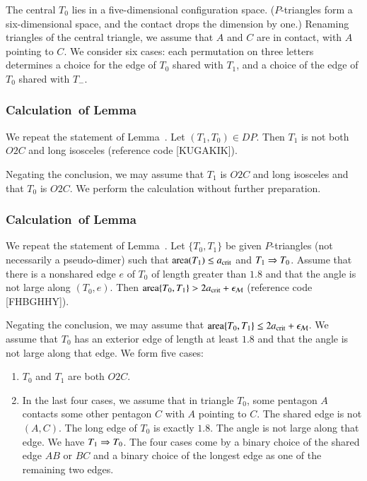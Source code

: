 The central $T_0$ lies in a five-dimensional configuration
space. ($P$-triangles form a six-dimensional space, and the contact
drops the dimension by one.)  Renaming triangles of the central
triangle, we assume that $A$ and $C$ are in contact, with $A$ pointing
to $C$.  We consider six cases: each permutation on three letters
determines a choice for the edge of $T_0$ shared with $T_1$, and a
choice of the edge of $T_0$ shared with $T_-$.

\subsubsection{Calculation~of Lemma~}

We repeat the statement of Lemma~.  Let
$(T_1,T_0)\in DP$.  Then $T_1$ is not both $O2C$ and long isosceles
(reference code [KUGAKIK]).

Negating the conclusion, we may assume that $T_1$ is $O2C$ and long
isosceles and that $T_0$ is $O2C$.  We perform the calculation without
further preparation.

\subsubsection{Calculation~of Lemma~} %

We repeat the statement of Lemma~.  Let $\{T_0,T_1\}$
be given $P$-triangles (not necessarily a pseudo-dimer) such that
${\operatorname{area}}(T_1)\le a_\text{crit}$ and $T_1\Rightarrow T_0$.  Assume that there is a
nonshared edge $e$ of $T_0$ of length greater than $1.8$ and that the
angle is not large along $(T_0,e)$.  Then ${\operatorname{area}}\{T_0,T_1\} > 2a_\text{crit}
+ \epsilon_{\mathcal M}$ (reference code [FHBGHHY]).

Negating the conclusion, we may assume that ${\operatorname{area}}\{T_0,T_1\}\le
2a_\text{crit} + \epsilon_{\mathcal M}$.  We assume that $T_0$ has an exterior edge of length
at least $1.8$ and that the angle is not large along that edge.  We
form five cases:
\begin{enumerate}  
\item $T_0$ and $T_1$ are both $O2C$.
\item In the last four cases, we assume that in triangle $T_0$, some
  pentagon $A$ contacts some other pentagon $C$ with $A$ pointing to
  $C$.  The shared edge is not $(A,C)$. The long edge of $T_0$ is
  exactly $1.8$.  The angle is not large along that edge.  We have
  $T_1\Rightarrow T_0$.  The four cases come by a binary choice of the shared
  edge $AB$ or $BC$ and a binary choice of the longest edge as one of
  the remaining two edges.
\end{enumerate}

